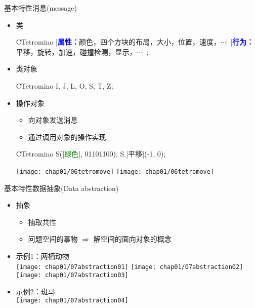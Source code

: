 \begin{frame}[t, fragile]{基本特性}{消息(message)}
  \begin{itemize}
  \item 类\\
    \begin{minipage}{0.8\linewidth}
      \begin{cpptt}
CTetromino{
  |\textbf{\textcolor{blue}{属性：}}颜色，四个方块的布局，大小，位置，速度，$\cdots$|
  |\textbf{\textcolor{blue}{行为：}}平移，旋转，加速，碰撞检测，显示，$\cdots$|
};
      \end{cpptt}
    \end{minipage}
  \item 类对象\\
    \begin{minipage}{0.8\linewidth}
      \begin{cppcode}
CTetromino I, J, L, O, S, T, Z;
      \end{cppcode}
    \end{minipage}
  \item 操作对象
    \begin{itemize}
    \item 向对象发送消息
    \item 通过调用对象的操作实现
    \end{itemize}
    \begin{minipage}{0.5\linewidth}
      \begin{cpptt}
CTetromino S(|\textcolor{green}{绿色}|, 01101100);
S.|平移|(-1, 0);
      \end{cpptt}
    \end{minipage} \qquad
    \texttt{[image: chap01/06tetromove]}\qquad%
    \texttt{[image: chap01/06tetromove]}%
  \end{itemize}
\end{frame}

\begin{frame}{基本特性}{数据抽象(Data abstraction)}
  \stretchon
  \begin{itemize}
  \item 抽象
    \begin{itemize}
    \item 抽取共性
    \item 问题空间的事物 $\Rightarrow$ 解空间的面向对象的概念
    \end{itemize}
  \item 示例1：两栖动物\\
    \texttt{[image: chap01/07abstraction01]} \qquad%
    \texttt{[image: chap01/07abstraction02]} \qquad%
    \texttt{[image: chap01/07abstraction03]} %
  \item 示例2：斑马\\
    \centering
    \texttt{[image: chap01/07abstraction04]}    
  \end{itemize}
  \stretchoff
\end{frame}

